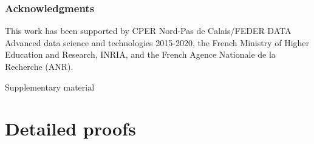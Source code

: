 \documentclass{article}
\begin{document}
\subsubsection*{Acknowledgments}

\vspace{-2mm}\noindent
This work has been supported by CPER Nord-Pas de Calais/FEDER DATA Advanced data science and technologies 2015-2020, the French Ministry of Higher Education and Research, INRIA, and the French Agence Nationale de la Recherche (ANR).

\small




\newpage

\begin{center}
\LARGE Supplementary material
\end{center}

\appendix

\section{Detailed proofs}
\end{document}
